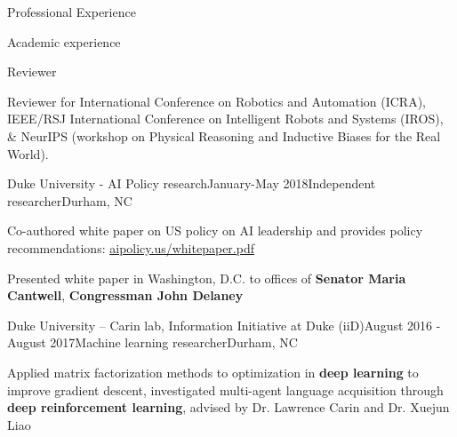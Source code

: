\documentclass[8pt]{resume}
\begin{document}
\begin{rSection}{Professional Experience}
\end{rSection}

\begin{rSection}{Academic experience}

\begin{rSubsection}{Reviewer}{}{}{}
\item Reviewer for International Conference on Robotics and Automation (ICRA), IEEE/RSJ International Conference on Intelligent Robots and Systems (IROS), \& NeurIPS (workshop on Physical Reasoning and Inductive Biases for the Real World).
\end{rSubsection}

\begin{rSubsection}{Duke University - AI Policy research}{January-May 2018}{Independent researcher}{Durham, NC}
\item Co-authored white paper on US policy on AI leadership and provides policy recommendations: \url{aipolicy.us/whitepaper.pdf}
\item Presented white paper in Washington, D.C. to offices of \textbf{Senator Maria Cantwell}, \textbf{Congressman John Delaney}
\end{rSubsection}

\begin{rSubsection}{Duke University -- Carin lab, Information Initiative at Duke (iiD)}{August 2016 - August 2017}{Machine learning researcher}{Durham, NC}
\item Applied matrix factorization methods to optimization in \textbf{deep learning} to improve gradient descent, investigated multi-agent language acquisition through \textbf{deep reinforcement learning}, advised by Dr. Lawrence Carin and Dr. Xuejun Liao
\end{rSubsection}

\end{rSection}
\end{document}
